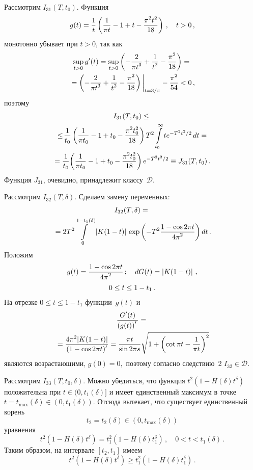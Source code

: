 \begin{multicols}{2}
Рассмотрим $I_{31}(T,t_0).$ Функция
$$
g(t)=\fr{1}{t}\left(\fr{1}{\pi t}-1+t-\fr{\pi^2t^2}{18}\right)\,,\quad
t>0\,,
$$
монотонно убывает при $t>0$, так как
\begin{multline*}
\sup_{t>0}g'(t)=\sup_{t>0}\left( -\fr{2}{\pi t^3} + \fr{1}{t^2}-
\fr{\pi^2}{18} \right)={}\\
{}= \left( -\fr{2}{\pi t^3} + \fr{1}{t^2}-
\fr{\pi^2}{18} \right)\bigg|_{t=3/\pi}
-\fr{\pi^2}{54}<0\,,
\end{multline*}
поэтому
\begin{multline*}
I_{31}(T,t_0)\le{}\\
{}\le
 \!\fr{1}{t_0}\left(\fr{1}{\pi
t_0}-1+t_0-\fr{\pi^2t_0^2}{18}\right) T^2\int\limits_{t_0}^\infty t e^{-T^2t^2/2}\,dt={}\\
\!{}= \fr{1}{t_0}\!\left(\fr{1}{\pi t_0}-1+ t_0-\fr{\pi^2t_0^2}{18}\right)e^{-T^2t^2/2}\equiv
J_{31}(T,t_0)\,.
\end{multline*}
Функция $J_{31}$, очевидно, принадлежит классу~$\mathcal D$.
\columnbreak

Рассмотрим $I_{32}(T,\delta).$ Сделаем замену переменных:
\begin{multline*}
I_{32}(T,\delta)={}\\
{}=
2T^2\!\int\limits_0^{1-t_1(\delta)}{|K(1-t)|\,\exp\left(-T^2\fr{1-\cos 2\pi
t}{4\pi^2}\right)}\,dt\,.
\end{multline*}
Положим
\begin{multline*}
g(t)=\fr{1-\cos 2\pi t}{4\pi^2}\,;\quad dG(t)=\left|K(1-t)\right|\,,\\
 0\le t\le1-t_1\,.
\end{multline*}
На отрезке $0\le t\le1-t_1$ функции~$g(t)$ и
\begin{multline*}
\fr{G'(t)}{\left(g(t)\right)'}={}\\
{}= \fr{4\pi^2|K(1-t)|}{(1-\cos 2\pi
t)'}=\fr {\pi t}{\sin 2\pi s}\sqrt{1+\left(\cot \pi t-\fr{1}{\pi
t}\right)^2}
\end{multline*}
являются возрастающими, $g(0)=0,$ поэтому согласно
следствию~2 $I_{32}\in \mathcal D.$

Рассмотрим $I_{33}(T,t_0,\delta)$. Можно убедиться, что функция
${t^2(1-H(\delta)t^{\delta})}$ положительна при ${t\in(0,t_1(\delta)]}$ и имеет
единственный максимум в точке ${t=t_{\max}(\delta)\in(0,t_1(\delta))}$.
Отсюда вытекает, что существует единственный корень
$$
t_2=t_2(\delta)\in(0,t_{\max}(\delta))
$$
уравнения
$$
t^2(1-H(\delta)t^{\delta})=t_1^2(1-H(\delta)t_1^{\delta})\,,\quad 0<t< t_1(\delta)\,.
$$
Таким образом, на интервале $[t_2,t_1]$ имеем
$$
t^2\left(1-H\left(\delta\right)t^{\delta}\right)\ge t_1^2\left(1-H\left(\delta\right)t_1^{\delta}\right)\,.
$$


\end{multicols}
